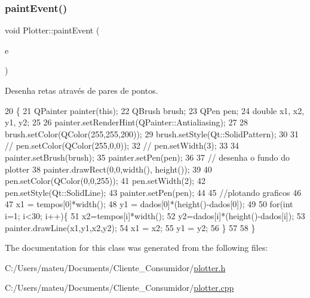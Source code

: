 \subsubsection{\texorpdfstring{paint\+Event()}{paintEvent()}}
{\footnotesize\ttfamily void Plotter\+::paint\+Event (\begin{DoxyParamCaption}\item[{Q\+Paint\+Event $\ast$}]{e }\end{DoxyParamCaption})}



Desenha retas através de pares de pontos. 


\begin{DoxyCode}
20 \{
21     QPainter painter(\textcolor{keyword}{this});
22     QBrush brush;
23     QPen pen;
24     \textcolor{keywordtype}{double} x1, x2, y1, y2;
25 
26     painter.setRenderHint(QPainter::Antialiasing);
27 
28     brush.setColor(QColor(255,255,200));
29     brush.setStyle(Qt::SolidPattern);
30 
31 \textcolor{comment}{//    pen.setColor(QColor(255,0,0));}
32 \textcolor{comment}{//    pen.setWidth(3);}
33 
34     painter.setBrush(brush);
35     painter.setPen(pen);
36 
37     \textcolor{comment}{// desenha o fundo do plotter}
38     painter.drawRect(0,0,width(), height());
39 
40     pen.setColor(QColor(0,0,255));
41     pen.setWidth(2);
42     pen.setStyle(Qt::SolidLine);
43     painter.setPen(pen);
44 
45     \textcolor{comment}{//plotando graficos}
46 
47     x1 = tempos[0]*width();
48     y1 = dados[0]*(height()-dados[0]);
49 
50     \textcolor{keywordflow}{for}(\textcolor{keywordtype}{int} i=1; i<30; i++)\{
51         x2=tempos[i]*width();
52         y2=dados[i]*(height()-dados[i]);
53         painter.drawLine(x1,y1,x2,y2);
54         x1 = x2;
55         y1 = y2;
56     \}
57 
58 \}
\end{DoxyCode}


The documentation for this class was generated from the following files\+:\begin{DoxyCompactItemize}
\item 
C\+:/\+Users/mateu/\+Documents/\+Cliente\+\_\+\+Consumidor/\mbox{\hyperlink{plotter_8h}{plotter.\+h}}\item 
C\+:/\+Users/mateu/\+Documents/\+Cliente\+\_\+\+Consumidor/\mbox{\hyperlink{plotter_8cpp}{plotter.\+cpp}}\end{DoxyCompactItemize}
